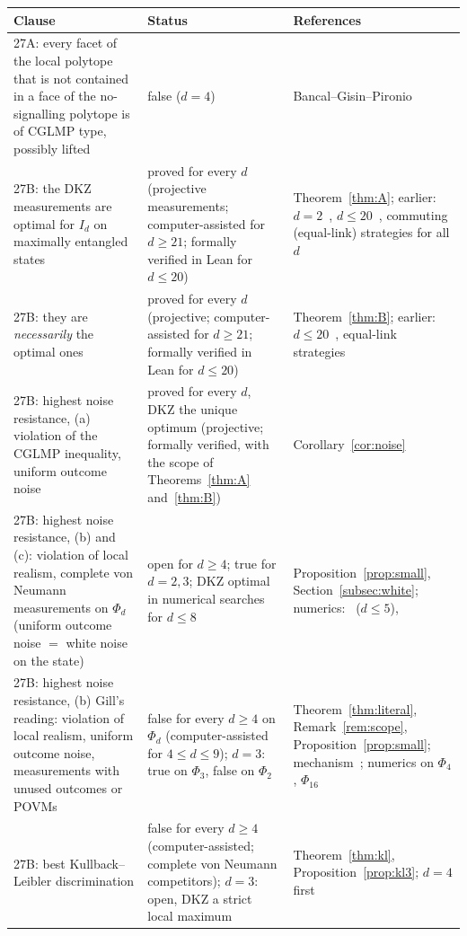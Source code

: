 \documentclass[11pt]{amsart}
\theoremstyle{definition}
\theoremstyle{remark}
\numberwithin{equation}{section}
\begin{document}
\begin{table}[ht]
\small
\begin{tabular}{@{}>{\raggedright\arraybackslash}p{}>{\raggedright\arraybackslash}p{}>{\raggedright\arraybackslash}p{}@{}}
\toprule
Clause & Status & References\\
\midrule
27A: every facet of the local polytope that is not contained in a face of the no-signalling polytope is of CGLMP
type, possibly lifted & false ($d=4$) & Bancal--Gisin--Pironio~\cite{BGP}\\
27B: the DKZ measurements are optimal for $I_d$ on maximally entangled states & proved for every $d$ (projective
measurements; computer-assisted for $d\ge21$; formally verified in Lean for $d\le20$) & Theorem~\ref{thm:A}; earlier:
$d=2$~\cite{Tsirelson}, $d\le20$~\cite{repo-cglmp}, commuting (equal-link) strategies for all $d$~\cite{MS-classical}\\
27B: they are \emph{necessarily} the optimal ones & proved for every $d$ (projective; computer-assisted for $d\ge21$;
formally verified in Lean for $d\le20$) & Theorem~\ref{thm:B}; earlier: $d\le20$~\cite{repo-cglmp}, equal-link
strategies~\cite{MS-classical}\\
27B: highest noise resistance, (a) violation of the CGLMP inequality, uniform outcome noise & proved for every $d$, DKZ
the unique optimum (projective; formally verified, with the scope of Theorems~\ref{thm:A} and~\ref{thm:B}) &
Corollary~\ref{cor:noise}\\
27B: highest noise resistance, (b) and (c): violation of local realism, complete von Neumann measurements on $\Phi_d$
(uniform outcome noise $=$ white noise on the state) & open for $d\ge4$; true for $d=2,3$; DKZ optimal in numerical
searches for $d\le8$ & Proposition~\ref{prop:small}, Section~\ref{subsec:white}; numerics:~\cite{GLZ} ($d\le5$),
\cite{repo-oqp27}\\
27B: highest noise resistance, (b) Gill's reading: violation of local realism, uniform outcome noise, measurements with
unused outcomes or POVMs & false for every $d\ge4$ on $\Phi_d$ (computer-assisted for $4\le d\le9$); $d=3$: true on
$\Phi_3$, false on $\Phi_2$ & Theorem~\ref{thm:literal}, Remark~\ref{rem:scope}, Proposition~\ref{prop:small};
mechanism~\cite{ADGL}; numerics on $\Phi_4$, $\Phi_{16}$~\cite{BRL}\\
27B: best Kullback--Leibler discrimination & false for every $d\ge4$ (computer-assisted; complete von Neumann
competitors); $d=3$: open, DKZ a strict local maximum & Theorem~\ref{thm:kl}, Proposition~\ref{prop:kl3}; $d=4$ first

\end{tabular}
\end{table}
\end{document}
